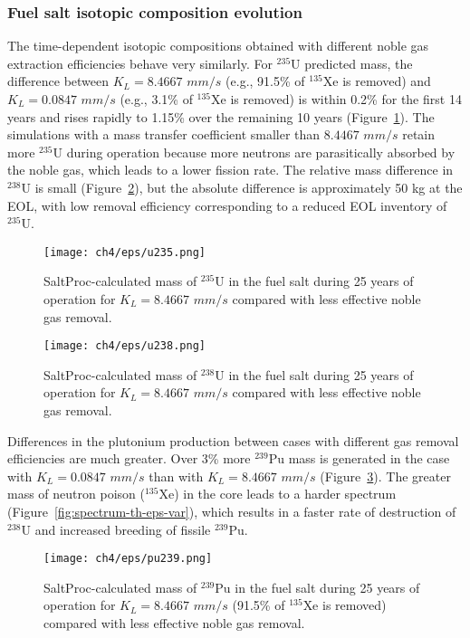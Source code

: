 \subsubsection{Fuel salt isotopic composition evolution}
The time-dependent isotopic compositions obtained with different noble gas 
extraction efficiencies behave very similarly. For $^{235}$U predicted mass, 
the difference between $K_L=8.4667$ $mm/s$ (e.g., 91.5\% of $^{135}$Xe is 
removed) and $K_L=0.0847$ $mm/s$ (e.g., 3.1\% of $^{135}$Xe is removed) is 
within 0.2\% for 
the first 14 years and rises rapidly to 1.15\% over the remaining 10 years  
(Figure~\ref{fig:u235-eps-var}). The simulations with a mass transfer  
coefficient smaller than $8.4467$ $mm/s$ retain more
$^{235}$U during operation because more neutrons are parasitically 
absorbed by the noble gas, which leads to a lower fission rate. The 
relative mass difference in $^{238}$U is small 
(Figure~\ref{fig:u238-eps-var}), but the absolute difference is approximately 
50 kg at the \gls{EOL}, with low removal efficiency corresponding to a reduced 
\gls{EOL} inventory of $^{235}$U.
\begin{figure}[htp!] %
	\centering
	\texttt{[image: ch4/eps/u235.png]}
		\vspace{-4mm}
	\caption{SaltProc-calculated mass of $^{235}$U in the fuel salt during 
		25 years of operation for $K_L=8.4667$ $mm/s$ compared with less 
		effective noble gas removal.}
	\label{fig:u235-eps-var}
\end{figure}
\begin{figure}[hbp!] %
	\centering
	\texttt{[image: ch4/eps/u238.png]}
		\vspace{-4mm}
	\caption{SaltProc-calculated mass of $^{238}$U in the fuel salt during 
		25 years of operation for $K_L=8.4667$ $mm/s$ compared with less 
		effective noble gas removal.}
	\label{fig:u238-eps-var}
\end{figure}

Differences in the plutonium production between cases with different gas 
removal efficiencies are much greater. Over 3\% more $^{239}$Pu mass is 
generated in 
the case with $K_L=0.0847$ $mm/s$ than with $K_L=8.4667$ $mm/s$ 
(Figure~\ref{fig:pu239-eps-var}). The greater mass of neutron poison 
($^{135}$Xe) in the core leads to a harder spectrum 
(Figure~\ref{fig:spectrum-th-eps-var}), which results in a faster rate of 
destruction of $^{238}$U and increased breeding of fissile $^{239}$Pu.
\begin{figure}[hbp!] %
	\centering
	\texttt{[image: ch4/eps/pu239.png]}
	\caption{SaltProc-calculated mass of $^{239}$Pu in the fuel salt during 
		25 years of operation for $K_L=8.4667$ $mm/s$ (91.5\% of $^{135}$Xe is 
		removed) compared with less effective noble gas removal.}
	\label{fig:pu239-eps-var}
\end{figure}


